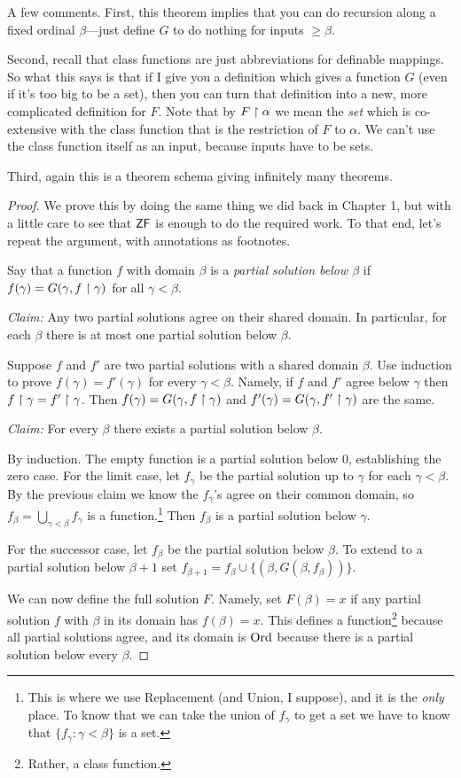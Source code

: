 \documentclass[10pt]{amsart}
\begin{document}
A few comments. First, this theorem implies that you can do recursion along a fixed ordinal $\beta$---just define $G$ to do nothing for inputs $\ge \beta$.

Second, recall that class functions are just abbreviations for definable mappings. So what this says is that if I give you a definition which gives a function $G$ (even if it's too big to be a set), then you can turn that definition into a new, more complicated definition for $F$. Note that by $F \upharpoonright \alpha$ we mean the \emph{set} which is co-extensive with the class function that is the restriction of $F$ to $\alpha$. We can't use the class function itself as an input, because inputs have to be sets.

Third, again this is a theorem schema giving infinitely many theorems.

\begin{proof}
We prove this by doing the same thing we did back in Chapter 1, but with a little care to see that $\mathsf{ZF}$ is enough to do the required work. To that end, let's repeat the argument, with annotations as footnotes.

Say that a function $f$ with domain $\beta$ is a \emph{partial solution below  $\beta$} if $f(\gamma) = G(\gamma, f \upharpoonright \gamma)$ for all $\gamma < \beta$.

\textit{Claim:} Any two partial solutions agree on their shared domain. In particular, for each $\beta$ there is at most one partial solution below $\beta$.

Suppose $f$ and $f'$ are two partial solutions with a shared domain $\beta$. Use induction to prove $f(\gamma) = f'(\gamma)$ for every $\gamma < \beta$. Namely, if $f$ and $f'$ agree below $\gamma$ then $f \upharpoonright \gamma = f' \upharpoonright \gamma$. Then $f(\gamma) = G(\gamma, f \upharpoonright \gamma)$ and $f'(\gamma) = G(\gamma, f' \upharpoonright \gamma)$ are the same.

\textit{Claim:} For every $\beta$ there exists a partial solution below $\beta$.

By induction. The empty function is a partial solution below $0$, establishing the zero case. For the limit case, let $f_\gamma$ be the partial solution up to $\gamma$ for each $\gamma < \beta$. By the previous claim we know the $f_\gamma$'s agree on their common domain, so $f_\beta = \bigcup_{\gamma < \beta} f_\gamma$ is a function.\footnote{This is where we use Replacement (and Union, I suppose), and it is the \emph{only} place. To know that we can take the union of $f_\gamma$ to get a set we have to know that $\{f_\gamma : \gamma < \beta \}$ is a set.} 
Then $f_\beta$ is a partial solution below $\gamma$.

For the successor case, let $f_\beta$ be the partial solution below $\beta$. To extend to a partial solution below $\beta+1$ set $f_{\beta + 1} = f_\beta \cup \{(\beta,G(\beta, f_\beta))\}$.

We can now define the full solution $F$. Namely, set $F(\beta) = x$ if any partial solution $f$ with $\beta$ in its domain has $f(\beta) = x$. This defines a function\footnote{Rather, a class function.} because all partial solutions agree, and its domain is $\mathrm{Ord}$ because there is a partial solution below every $\beta$.
\end{proof}
\end{document}
